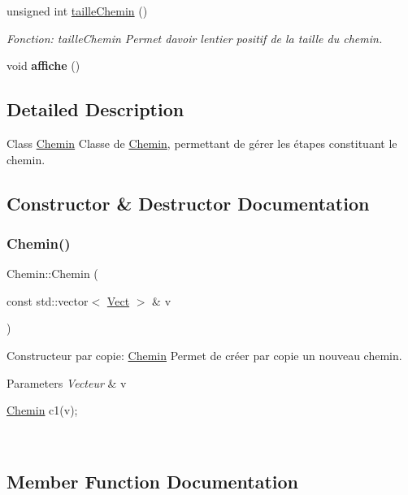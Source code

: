\begin{DoxyCompactItemize}
unsigned int \hyperlink{classChemin_a7153e040b29f294f30793a698cde23b3}{taille\+Chemin} ()
\begin{DoxyCompactList}\small\item\em Fonction\+: taille\+Chemin Permet d\textquotesingle{}avoir l\textquotesingle{}entier positif de la taille du chemin. \end{DoxyCompactList}\item 
\mbox{\label{classChemin_aca468327c0fc8ce57727bc13edfa741e}} 
void {\bfseries affiche} ()
\end{DoxyCompactItemize}


\subsection{Detailed Description}
Class \hyperlink{classChemin}{Chemin} Classe de \hyperlink{classChemin}{Chemin}, permettant de gérer les étapes constituant le chemin. 

\subsection{Constructor \& Destructor Documentation}
\mbox{\label{classChemin_acbb44d2dd9c7eda79740c3ddb2b435c5}} 
\subsubsection{\texorpdfstring{Chemin()}{Chemin()}}
{\footnotesize\ttfamily Chemin\+::\+Chemin (\begin{DoxyParamCaption}\item[{const std\+::vector$<$ \hyperlink{classVect}{Vect} $>$ \&}]{v }\end{DoxyParamCaption})}



Constructeur par copie\+: \hyperlink{classChemin}{Chemin} Permet de créer par copie un nouveau chemin. 


\begin{DoxyParams}{Parameters}
{\em Vecteur} & v 
\begin{DoxyCode}
\hyperlink{classChemin}{Chemin} c1(v);
\end{DoxyCode}
 \\
\hline
\end{DoxyParams}


\subsection{Member Function Documentation}
\mbox{\label{classChemin_a4cdbe032bca015c52dccbef4fa2cb647}} 
